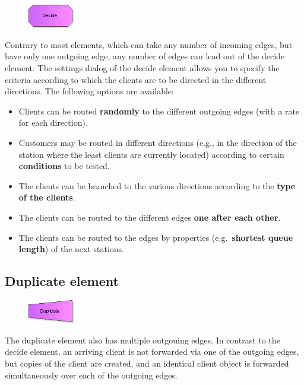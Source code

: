 \documentclass{svmono}
\begin{document}
\begin{figure}
\vspace{-22pt}
\includegraphics[width=2cm]{IconDecide.png}
\vspace{-22pt}
\end{figure}
Contrary to most elements, which can take any number of incoming edges, but have only one outgoing edge, any number of edges can lead out of the decide element. The settings dialog of the decide element allows you to specify the criteria according to which the clients are to be directed in the different directions. The following options are available:
\begin{itemize}
\item
Clients can be routed \textbf{randomly} to the different outgoing edges (with a rate for each direction).
\item
Customers may be routed in different directions (e.g., in the direction of the station where the least clients are currently located) according to certain \textbf{conditions} to be tested.
\item
The clients can be branched to the various directions according to the \textbf{type of the clients}.
\item
The clients can be routed to the different edges \textbf{one after each other}.
\item
The clients can be routed to the edges by properties (e.g.\ \textbf{shortest queue length}) of the next stations.
\end{itemize}

\subsection*{Duplicate element}

\begin{figure}
\vspace{-22pt}
\includegraphics[width=2cm]{IconDuplicate.png}
\vspace{-22pt}
\end{figure}
The duplicate element also has multiple outgouing edges. In contrast to the decide element, an arriving client is not forwarded via one of the outgoing edges, but copies of the client are created, and an identical client object is forwarded simultaneously over each of the outgoing edges.
\end{document}
